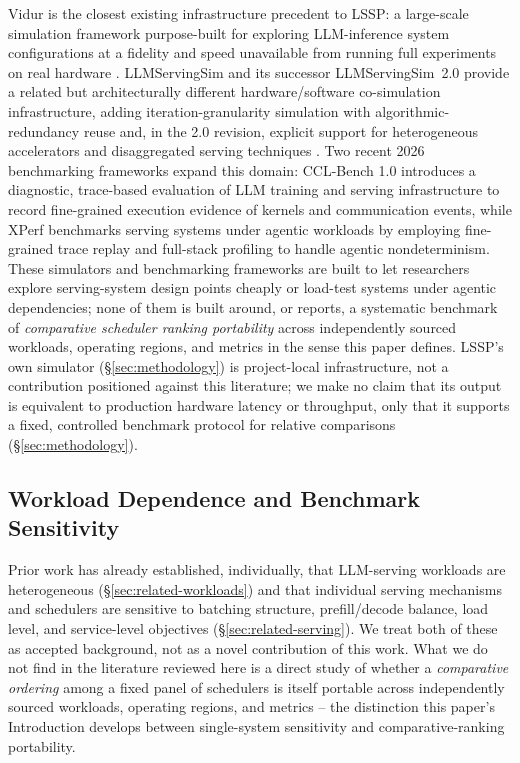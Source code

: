 \documentclass[sn-basic,Numbered,pdflatex]{sn-jnl}
\begin{document}
Vidur is the closest existing infrastructure precedent to LSSP: a
large-scale simulation framework purpose-built for exploring LLM-inference
system configurations at a fidelity and speed unavailable from
running full experiments on real hardware \citep{vidur2024}. LLMServingSim
and its successor LLMServingSim~2.0 provide a related but architecturally
different hardware/software co-simulation infrastructure, adding
iteration-granularity simulation with algorithmic-redundancy reuse and,
in the 2.0 revision, explicit support for heterogeneous accelerators and
disaggregated serving techniques \citep{llmservingsim2024,llmservingsim2_2025}.
Two recent 2026 benchmarking frameworks expand this domain: CCL-Bench 1.0
\citep{ding2026cclbench} introduces a diagnostic, trace-based evaluation
of LLM training and serving infrastructure to record fine-grained execution
evidence of kernels and communication events, while XPerf \citep{wang2026xperf}
benchmarks serving systems under agentic workloads by employing fine-grained
trace replay and full-stack profiling to handle agentic nondeterminism.
These simulators and benchmarking frameworks are built to let researchers
explore serving-system design points cheaply or load-test systems under
agentic dependencies; none of them is built around, or reports, a systematic
benchmark of \emph{comparative scheduler ranking portability} across
independently sourced workloads, operating regions, and metrics in the sense
this paper defines. LSSP's own simulator (\S\ref{sec:methodology}) is
project-local infrastructure, not a contribution positioned against this
literature; we make no claim that its output is equivalent to production
hardware latency or throughput, only that it supports a fixed, controlled
benchmark protocol for relative comparisons (\S\ref{sec:methodology}).

\subsection{Workload Dependence and Benchmark Sensitivity}
\label{sec:related-dependence}

Prior work has already established, individually, that LLM-serving
workloads are heterogeneous (\S\ref{sec:related-workloads}) and that
individual serving mechanisms and schedulers are sensitive to batching
structure, prefill/decode balance, load level, and service-level
objectives (\S\ref{sec:related-serving}). We treat both of these as accepted
background, not as a novel contribution of this work. What we do not find
in the literature reviewed here is a direct study of whether a
\emph{comparative ordering} among a fixed panel of schedulers is itself
portable across independently sourced workloads, operating regions, and
metrics -- the distinction this paper's Introduction develops between
single-system sensitivity and comparative-ranking portability.
\end{document}
